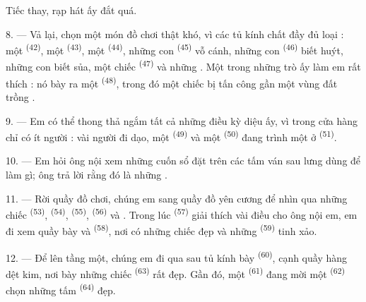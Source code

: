 Tiếc thay, rạp hát ấy đắt quá.

8. --- Vả lại, chọn một món đồ chơi thật khó, vì các tủ kính chất đầy đủ loại : một
 \textsuperscript{(42)}, một 
\textsuperscript{(43)}, một  \textsuperscript{(44)}, những con
 \textsuperscript{(45)} vỗ cánh, những con 
\textsuperscript{(46)} biết huýt, những con  biết sủa, một chiếc
 \textsuperscript{(47)} và những . Một trong
những trò ấy làm em rất thích : nó bày ra một 
\textsuperscript{(48)}, trong đó một chiếc  bị  tấn
công gần một vùng đất trồng .


9. --- Em có thể thong thả ngắm tất cả những điều kỳ diệu ấy, vì trong cửa hàng chỉ có
ít người : vài người đi dạo, một  \textsuperscript{(49)} và một
 \textsuperscript{(50)} đang trình một  ở
 \textsuperscript{(51)}.

10. --- Em hỏi ông nội xem những cuốn sổ đặt trên các tấm ván sau lưng  dùng để làm gì; ông trả lời rằng đó là những .

\VUsaut{3.6mm}
\VUsaut{2.8mm}

11. --- Rời quầy đồ chơi, chúng em sang quầy đồ yên cương để nhìn qua những chiếc
 \textsuperscript{(53)},  \textsuperscript{(54)},
 \textsuperscript{(55)},  \textsuperscript{(56)} và
. Trong lúc  \textsuperscript{(57)} giải thích vài
điều cho ông nội em, em đi xem quầy bày  và 
\textsuperscript{(58)}, nơi có những chiếc  đẹp và những
 \textsuperscript{(59)} tinh xảo.

12. --- Để lên tầng một, chúng em đi qua sau tủ kính bày 
\textsuperscript{(60)}, cạnh quầy hàng dệt kim, nơi bày những chiếc 
\textsuperscript{(63)} rất đẹp. Gần đó, một  \textsuperscript{(61)}
đang mời một  \textsuperscript{(62)} chọn những tấm 
\textsuperscript{(64)} đẹp.

